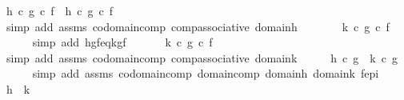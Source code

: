 \begin{isabellebody}
\ {\isachardoublequoteopen}{\isacharparenleft}{\kern0pt}h\ {\isasymcirc}\isactrlsub c\ g{\isacharparenright}{\kern0pt}\ {\isasymcirc}\isactrlsub c\ f\ {\isacharequal}{\kern0pt}\ h\ {\isasymcirc}\isactrlsub c\ {\isacharparenleft}{\kern0pt}g\ {\isasymcirc}\isactrlsub c\ f{\isacharparenright}{\kern0pt}{\isachardoublequoteclose}\isanewline
\ \ \ \ \isamarkupfalse%
\ {\isacharparenleft}{\kern0pt}simp\ add{\isacharcolon}{\kern0pt}\ assms\ codomain{\isacharunderscore}{\kern0pt}comp\ comp{\isacharunderscore}{\kern0pt}associative\ domain{\isacharunderscore}{\kern0pt}h{\isacharparenright}{\kern0pt}\isanewline
\ \ \isamarkupfalse%
\ \isamarkupfalse%
\ {\isachardoublequoteopen}{\isachardot}{\kern0pt}{\isachardot}{\kern0pt}{\isachardot}{\kern0pt}\ {\isacharequal}{\kern0pt}\ k\ {\isasymcirc}\isactrlsub c\ {\isacharparenleft}{\kern0pt}g\ {\isasymcirc}\isactrlsub c\ f{\isacharparenright}{\kern0pt}{\isachardoublequoteclose}\isanewline
\ \ \ \ \isamarkupfalse%
\ {\isacharparenleft}{\kern0pt}simp\ add{\isacharcolon}{\kern0pt}\ hgf{\isacharunderscore}{\kern0pt}eq{\isacharunderscore}{\kern0pt}kgf{\isacharparenright}{\kern0pt}\isanewline
\ \ \isamarkupfalse%
\ \isamarkupfalse%
\ {\isachardoublequoteopen}{\isachardot}{\kern0pt}{\isachardot}{\kern0pt}{\isachardot}{\kern0pt}\ {\isacharequal}{\kern0pt}{\isacharparenleft}{\kern0pt}k\ {\isasymcirc}\isactrlsub c\ g{\isacharparenright}{\kern0pt}\ {\isasymcirc}\isactrlsub c\ f\ {\isachardoublequoteclose}\isanewline
\ \ \ \ \isamarkupfalse%
\ {\isacharparenleft}{\kern0pt}simp\ add{\isacharcolon}{\kern0pt}\ assms\ codomain{\isacharunderscore}{\kern0pt}comp\ comp{\isacharunderscore}{\kern0pt}associative\ domain{\isacharunderscore}{\kern0pt}k{\isacharparenright}{\kern0pt}\isanewline
\ \ \isamarkupfalse%
\ \isamarkupfalse%
\ {\isachardoublequoteopen}h\ {\isasymcirc}\isactrlsub c\ g\ {\isacharequal}{\kern0pt}\ k\ {\isasymcirc}\isactrlsub c\ g{\isachardoublequoteclose}\isanewline
\ \ \ \ \isamarkupfalse%
\ {\isacharparenleft}{\kern0pt}simp\ add{\isacharcolon}{\kern0pt}\ assms\ codomain{\isacharunderscore}{\kern0pt}comp\ domain{\isacharunderscore}{\kern0pt}comp\ domain{\isacharunderscore}{\kern0pt}h\ domain{\isacharunderscore}{\kern0pt}k\ f{\isacharunderscore}{\kern0pt}epi{\isacharparenright}{\kern0pt}\isanewline
\ \ \isamarkupfalse%
\ \isamarkupfalse%
\ {\isachardoublequoteopen}h\ {\isacharequal}{\kern0pt}\ k{\isachardoublequoteclose}\isanewline

\end{isabellebody}
